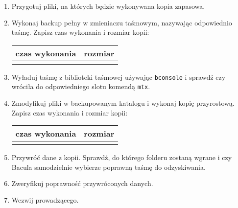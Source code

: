 \documentclass[polish]{article}
\begin{document}
\begin{enumerate}

\item Przygotuj pliki, na których będzie wykonywana kopia zapasowa.

\item Wykonaj backup pełny w zmieniaczu taśmowym, nazywając odpowiednio taśmę. Zapisz czas wykonania i rozmiar kopii:

\begin{tabular}{|c|c|}
  \hline
  czas wykonania & rozmiar \\
  \hline
  & \\
  \hline
\end{tabular}

\item Wyładuj taśmę z biblioteki taśmowej używając \texttt{bconsole} i sprawdź czy wróciła do odpowiedniego slotu komendą \texttt{mtx}.

\item Zmodyfikuj pliki w backupowanym katalogu i wykonaj kopię przyrostową. Zapisz czas wykonania i rozmiar kopii:

\begin{tabular}{|c|c|}
  \hline
  czas wykonania & rozmiar \\
  \hline
  & \\
  \hline
\end{tabular}

\item Przywróć dane z kopii. Sprawdź, do którego folderu zostaną wgrane i czy Bacula samodzielnie wybierze poprawną taśmę do odzyskiwania.

\item Zweryfikuj poprawność przywróconych danych.

\item Wezwij prowadzącego.

\end{enumerate}
\end{document}
